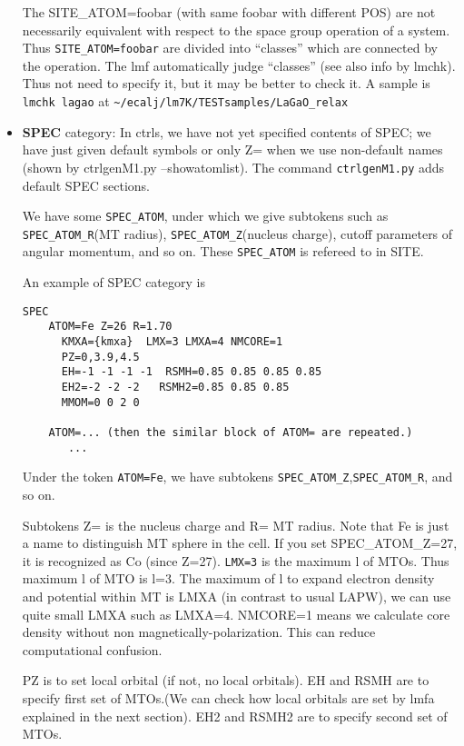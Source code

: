 \documentclass[a4paper,10pt,epsf,fleqn]{article}
\begin{document}
\begin{itemize}
The SITE\_ATOM=foobar (with same foobar with different POS) are not
necessarily equivalent with respect to the space group operation of a system.
Thus \verb+SITE_ATOM=foobar+ are divided into ``classes'' which are
connected by the operation. 
The lmf automatically judge ``classes'' (see also info by lmchk). 
Thus not need to specify it, but it may be better to check it.
A sample is \verb+lmchk lagao+ at \verb+~/ecalj/lm7K/TESTsamples/LaGaO_relax+

\item
{\bf SPEC} category: 
In ctrls, we have not yet specified contents of SPEC; 
we have just given default symbols or only Z= when we use non-default
names (shown by ctrlgenM1.py --showatomlist).
The command \verb+ctrlgenM1.py+ adds default SPEC sections.

We have some \verb+SPEC_ATOM+, 
under which we give subtokens such as
\verb+SPEC_ATOM_R+(MT radius), \verb+SPEC_ATOM_Z+(nucleus charge), 
cutoff parameters of angular momentum, and so on. 
These \verb+SPEC_ATOM+ is refereed to in SITE.

An example of SPEC category is
\begin{verbatim}
SPEC                                                            
    ATOM=Fe Z=26 R=1.70 
      KMXA={kmxa}  LMX=3 LMXA=4 NMCORE=1                        
      PZ=0,3.9,4.5
      EH=-1 -1 -1 -1  RSMH=0.85 0.85 0.85 0.85          
      EH2=-2 -2 -2   RSMH2=0.85 0.85 0.85
      MMOM=0 0 2 0                                                    
  
    ATOM=... (then the similar block of ATOM= are repeated.)
       ...
\end{verbatim}
Under the token \verb+ATOM=Fe+, we have subtokens
\verb+SPEC_ATOM_Z+,\verb+SPEC_ATOM_R+, and so on.

Subtokens Z= is the nucleus charge and R= MT radius.
Note that Fe is just a name to distinguish MT sphere in the cell.
If you set SPEC\_ATOM\_Z=27, it is recognized as Co (since Z=27). 
\verb+LMX=3+ is the maximum l of MTOs. Thus maximum l of MTO is l=3.
The maximum of l to expand electron density and potential within MT is
LMXA (in contrast to usual LAPW), we can use quite small LMXA such as
LMXA=4. NMCORE=1 means we calculate core density without non magnetically-polarization.
This can reduce computational confusion.

PZ is to set local orbital (if not, no local orbitals). EH and RSMH are
to specify first set of MTOs.(We can check how local orbitals are 
set by lmfa explained in the next section).
EH2 and RSMH2 are to specify second set of MTOs. 


\end{itemize}
\end{document}
